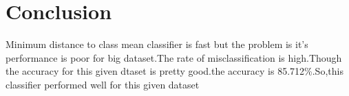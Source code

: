 \documentclass[12pt]{article}
\begin{document}
\newpage





\section{Conclusion}
Minimum distance to class mean classifier is fast but the problem is it's performance is poor for big dataset.The rate of misclassification is high.Though the accuracy for this given dtaset is pretty good.the accuracy is 85.712\%.So,this classifier performed well for this given dataset
\end{document}
